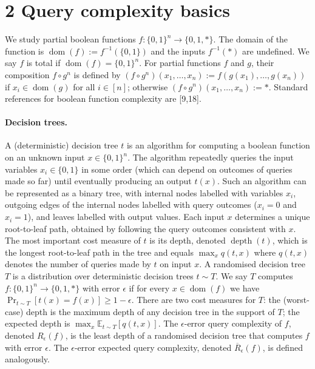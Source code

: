 \section*{2 Query complexity basics}
We study partial boolean functions $f:\{0,1\}^n\to\{0,1,*\}$. The domain of the function is $\operatorname{dom}(f):=f^{-1}(\{0,1\})$ and the inputs $f^{-1}(*)$ are undefined. We say $f$ is total if $\operatorname{dom}(f)=\{0,1\}^n$. For partial functions $f$ and $g$, their composition $f\circ g^n$ is defined by $(f\circ g^n)(x_1,\ldots,x_n):=f(g(x_1),\ldots,g(x_n))$ if $x_i\in\operatorname{dom}(g)$ for all $i\in[n]$; otherwise $(f\circ g^n)(x_1,\ldots,x_n):=*$. Standard references for boolean function complexity are [9,18].
\paragraph{Decision trees.} A (deterministic) decision tree $t$ is an algorithm for computing a boolean function on an unknown input $x\in\{0,1\}^n$. The algorithm repeatedly queries the input variables $x_i\in\{0,1\}$ in some order (which can depend on outcomes of queries made so far) until eventually producing an output $t(x)$. Such an algorithm can be represented as a binary tree, with internal nodes labelled with variables $x_i$, outgoing edges of the internal nodes labelled with query outcomes ($x_i=0$ and $x_i=1$), and leaves labelled with output values. Each input $x$ determines a unique root-to-leaf path, obtained by following the query outcomes consistent with $x$. The most important cost measure of $t$ is its depth, denoted $\operatorname{depth}(t)$, which is the longest root-to-leaf path in the tree and equals $\max_xq(t,x)$ where $q(t,x)$ denotes the number of queries made by $t$ on input $x$.
A randomised decision tree $T$ is a distribution over deterministic decision trees $t\sim T$. We say $T$ computes $f:\{0,1\}^n\to\{0,1,*\}$ with error $\epsilon$ if for every $x\in\operatorname{dom}(f)$ we have $\Pr_{t\sim T}[t(x)=f(x)]\ge1-\epsilon$. There are two cost measures for $T$: the (worst-case) depth is the maximum depth of any decision tree in the support of $T$; the expected depth is $\max_x\mathbb E_{t\sim T}[q(t,x)]$. The $\epsilon$-error query complexity of $f$, denoted $R_\epsilon(f)$, is the least depth of a randomised decision tree that computes $f$ with error $\epsilon$. The $\epsilon$-error expected query complexity, denoted $\overline R_\epsilon(f)$, is defined analogously.

